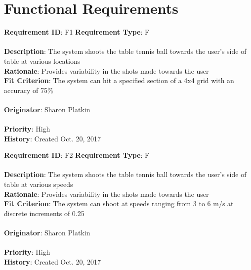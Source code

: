 \documentclass[11pt]{article}
\begin{document}
\section{Functional Requirements}

\begin{framed}
	\noindent\textbf{Requirement ID}: F1 \hfill \textbf{Requirement Type}: F \hfill\\\\
	\noindent\textbf{Description}: The system shoots the table tennis ball towards the user's side of table at various locations \\
	\textbf{Rationale}: Provides variability in the shots made towards the user \\
	\textbf{Fit Criterion}: The system can hit a specified section of a 4x4 grid with an accuracy of 75\%\\\\
	\textbf{Originator}: Sharon Platkin \\\\
	\textbf{Priority}: High \hfill \\
	\noindent\textbf{History}: Created Oct. 20, 2017
\end{framed}

\begin{framed}
	\noindent\textbf{Requirement ID}: F2 \hfill \textbf{Requirement Type}: F \hfill\\\\
	\noindent\textbf{Description}: The system shoots the table tennis ball towards the user's side of table at various speeds \\
	\textbf{Rationale}: Provides variability in the shots made towards the user \\
	\textbf{Fit Criterion}: The system can shoot at speeds ranging from 3 to 6 m/s at discrete increments of 0.25 \\\\
	\textbf{Originator}: Sharon Platkin \\\\
	\textbf{Priority}: High \hfill \\
	\noindent\textbf{History}: Created Oct. 20, 2017
\end{framed}
\end{document}
